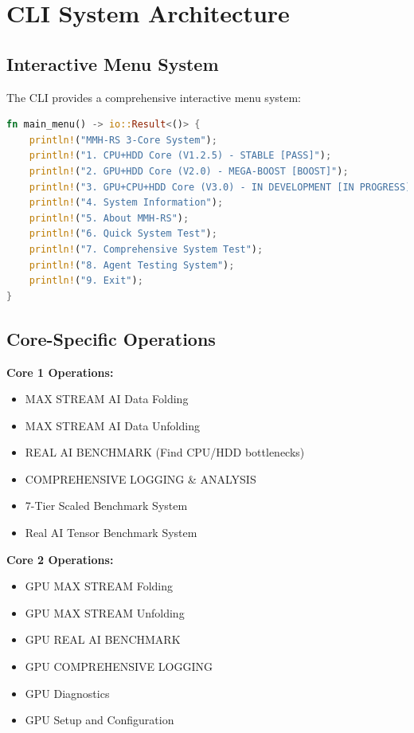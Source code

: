 \documentclass[12pt,a4paper]{article}
\begin{document}
\section{CLI System Architecture}

\subsection{Interactive Menu System}

The CLI provides a comprehensive interactive menu system:

\begin{lstlisting}[language=Rust, caption=Main Menu Structure]
fn main_menu() -> io::Result<()> {
    println!("MMH-RS 3-Core System");
    println!("1. CPU+HDD Core (V1.2.5) - STABLE [PASS]");
    println!("2. GPU+HDD Core (V2.0) - MEGA-BOOST [BOOST]");
    println!("3. GPU+CPU+HDD Core (V3.0) - IN DEVELOPMENT [IN PROGRESS]");
    println!("4. System Information");
    println!("5. About MMH-RS");
    println!("6. Quick System Test");
    println!("7. Comprehensive System Test");
    println!("8. Agent Testing System");
    println!("9. Exit");
}
\end{lstlisting}

\subsection{Core-Specific Operations}

\textbf{Core 1 Operations:}
\begin{itemize}
    \item MAX STREAM AI Data Folding
    \item MAX STREAM AI Data Unfolding
    \item REAL AI BENCHMARK (Find CPU/HDD bottlenecks)
    \item COMPREHENSIVE LOGGING \& ANALYSIS
    \item 7-Tier Scaled Benchmark System
    \item Real AI Tensor Benchmark System
\end{itemize}

\textbf{Core 2 Operations:}
\begin{itemize}
    \item GPU MAX STREAM Folding
    \item GPU MAX STREAM Unfolding
    \item GPU REAL AI BENCHMARK
    \item GPU COMPREHENSIVE LOGGING
    \item GPU Diagnostics
    \item GPU Setup and Configuration
\end{itemize}
\end{document}
